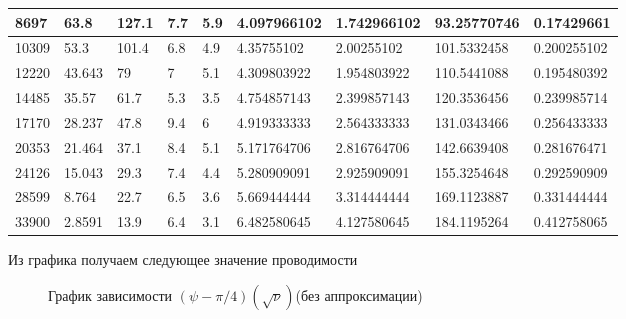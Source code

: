 \documentclass[a4paper, 12pt]{article}
\begin{document}
\begin{table}[!ht]
\begin{tabular}{|l|l|l|l|l|l|l|l|l|}
        8697 & 63.8 & 127.1 & 7.7 & 5.9 & 4.097966102 & 1.742966102 & 93.25770746 & 0.17429661 \\ \hline
        10309 & 53.3 & 101.4 & 6.8 & 4.9 & 4.35755102 & 2.00255102 & 101.5332458 & 0.200255102 \\ \hline
        12220 & 43.643 & 79 & 7 & 5.1 & 4.309803922 & 1.954803922 & 110.5441088 & 0.195480392 \\ \hline
        14485 & 35.57 & 61.7 & 5.3 & 3.5 & 4.754857143 & 2.399857143 & 120.3536456 & 0.239985714 \\ \hline
        17170 & 28.237 & 47.8 & 9.4 & 6 & 4.919333333 & 2.564333333 & 131.0343466 & 0.256433333 \\ \hline
        20353 & 21.464 & 37.1 & 8.4 & 5.1 & 5.171764706 & 2.816764706 & 142.6639408 & 0.281676471 \\ \hline
        24126 & 15.043 & 29.3 & 7.4 & 4.4 & 5.280909091 & 2.925909091 & 155.3254648 & 0.292590909 \\ \hline
        28599 & 8.764 & 22.7 & 6.5 & 3.6 & 5.669444444 & 3.314444444 & 169.1123887 & 0.331444444 \\ \hline
        33900 & 2.8591 & 13.9 & 6.4 & 3.1 & 6.482580645 & 4.127580645 & 184.1195264 & 0.412758065 \\ \hline
    \end{tabular}
	
\end{table}
\newpage
Из графика получаем следующее значение проводимости
\begin{figure}[h]
    \caption{График зависимости $(\psi - \pi/4)(\sqrt{\nu})$(без аппроксимации)}\label{fig:psi_sqrt_nu}
    \newpage
\end{figure}
\end{document}
